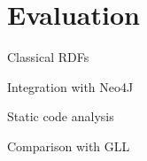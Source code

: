 \section{Evaluation}

Classical RDFs

Integration with Neo4J

Static code analysis

Comparison with GLL